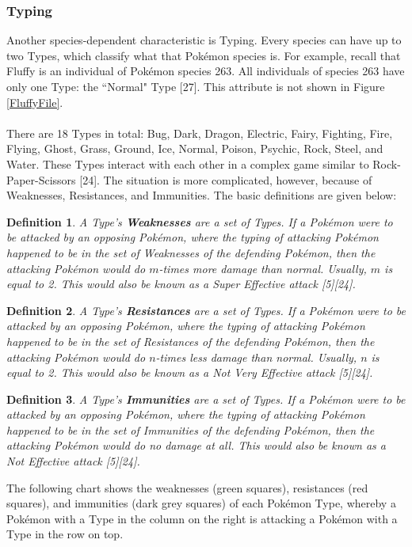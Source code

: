 \documentclass{article}
\newtheorem*{definition*}{Definition}
\begin{document}
\subsubsection{Typing}
Another species-dependent characteristic is Typing. Every species can have up to two Types, which classify what that Pok\'emon species is. For example, recall that Fluffy is an individual of Pok\'emon species 263. All individuals of species 263 have only one Type: the ``Normal" Type [27]. This attribute is not shown in Figure \ref{FluffyFile}.\\\\
There are 18 Types in total: Bug, Dark, Dragon, Electric, Fairy, Fighting, Fire, Flying, Ghost, Grass, Ground, Ice, Normal, Poison, Psychic, Rock, Steel, and Water. These Types interact with each other in a complex game similar to Rock-Paper-Scissors [24]. The situation is more complicated, however, because of Weaknesses, Resistances, and Immunities. The basic definitions are given below:
\begin{definition*}
	A Type's \textbf{Weaknesses} are a set of Types. If a Pok\'emon were to be attacked by an opposing Pok\'emon, where the typing of attacking Pok\'emon happened to be in the set of Weaknesses of the defending Pok\'emon, then the attacking Pok\'emon would do $m$-times more damage than normal. Usually, $m$ is equal to 2. This would also be known as a Super Effective attack [5][24].
\end{definition*}
\begin{definition*}
	A Type's \textbf{Resistances} are a set of Types. If a Pok\'emon were to be attacked by an opposing Pok\'emon, where the typing of attacking Pok\'emon happened to be in the set of Resistances of the defending Pok\'emon, then the attacking Pok\'emon would do $n$-times less damage than normal. Usually, $n$ is equal to 2. This would also be known as a Not Very Effective attack [5][24].
\end{definition*}
\begin{definition*}
	A Type's \textbf{Immunities} are a set of Types. If a Pok\'emon were to be attacked by an opposing Pok\'emon, where the typing of attacking Pok\'emon happened to be in the set of Immunities of the defending Pok\'emon, then the attacking Pok\'emon would do no damage at all. This would also be known as a Not Effective attack [5][24].
\end{definition*}
The following chart shows the weaknesses (green squares), resistances (red squares), and immunities (dark grey squares) of each Pok\'emon Type, whereby a Pok\'emon with a Type in the column on the right is attacking a Pok\'emon with a Type in the row on top.
\end{document}
